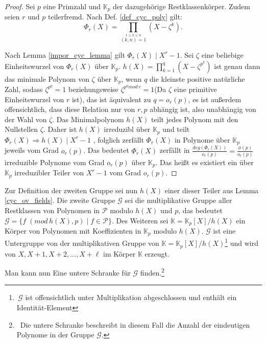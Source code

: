\documentclass[12pt,oneside]{article}
\theoremstyle{remark}
\theoremstyle{definition}
\begin{document}
\begin{proof}
    Sei $p$ eine Primzahl und $\mathbb{K}_{p}$ der dazugehörige Restklassenkörper. Zudem seien $r$ und $p$ teilerfremd. Nach Def. \ref{def_cyc_poly} gilt: 
    \begin{equation}\label{rth_cy}
        \Phi _{r}(X)=\prod _{\stackrel {1\leq k\leq n}{(k,n)=1}}\left(X- \zeta^k\right).
    \end{equation}
    
Nach Lemma \ref{impor_cyc_lemma} gilt $\Phi_{r}(X) \mid  X^{r} - 1$. Sei $\zeta$ eine beliebige Einheitswurzel von $\Phi_r(X)$  über $\mathbb{K}_p$. $h(X) = \prod_{k = 1}^{q} (X - \zeta^{p^k})$ ist genau dann das minimale Polynom von $\zeta$ über $\mathbb{K}_p$, wenn $q$ die kleinste positive natürliche Zahl, sodass $\zeta^{p^q} = 1$ beziehungsweise $\zeta^{p^q mod \, r} = 1$(Da $\zeta$ eine primitive Einheitswurzel von $r$ ist), das ist äquivalent zu $q = o_r(p)$, es ist außerdem offensichtlich, dass diese Relation nur von $r,p$ abhängig ist, also unabhängig von der Wahl von $\zeta$. Das Minimalpolynom $h(X)$ teilt jedes Polynom mit den Nullstellen $\zeta$. Daher ist $h(X)$ irreduzibl über $\mathbb{K}_p$ und teilt $\Phi_{r}(X) \Rightarrow h(X) \mid X^r - 1$ , folglich zerfällt $\Phi_r(X)$ in Polynome über $\mathbb{K}_p$ jeweils vom Grad $o_r(p)$. Das bedeutet $\Phi_{r}(X)$ zerfällt in $\frac{deg(\Phi_{r}(X))}{o_r(p)} = \frac{\phi(p)}{o_r(p)}$ irreduzible Polynome vom Grad $o_r(p)$ über $\mathbb{K}_p$. Das heißt es existiert ein über $\mathbb{K}_p$ irreduzibler Teiler von $X^r - 1$ vom Grad $o_r(p)$.              
\end{proof}

Zur Definition der zweiten Gruppe sei nun $h(X)$ einer dieser Teiler aus Lemma \ref{cyc_ov_fields}. Die zweite Gruppe $\mathcal{G}$ sei die multiplikative Gruppe aller Restklassen von Polynomen in $\mathcal{P}$ modulo $h(X)$ und $p$, das bedeutet $\mathcal{G} = \{f \; (mod \, h(X), p) \mid f \in \mathcal{P} \}$. Des Weiteren sei $\mathbb{K} = \mathbb{K}_p[X] /h(X)$ ein Körper von Polynomen mit Koeffizienten in $\mathbb{K}_{p}$ modulo $h(X)$. $\mathcal{G}$ ist eine Untergruppe von der multiplikativen Gruppe von  $\mathbb{K} = \mathbb{K}_p[X] / h(X)$\footnote{$ \, \mathcal{G}$ ist offensichtlich unter Multiplikation abgeschlossen und enthält ein Identität-Element} und wird von $X,X+1,X+2, ..., X + \ell $ im Körper $\mathbb{K}$ erzeugt.\newline

Man kann nun Eine untere Schranke für $\mathcal{G}$ finden.\footnote{$\,$ Die untere Schranke beschreibt in diesem Fall die Anzahl der eindeutigen Polynome in der Gruppe $\mathcal{G}$.}
\end{document}

